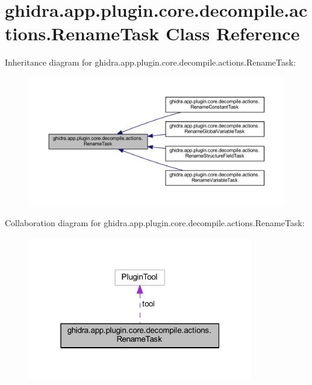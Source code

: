 \hypertarget{classghidra_1_1app_1_1plugin_1_1core_1_1decompile_1_1actions_1_1_rename_task}{}\section{ghidra.\+app.\+plugin.\+core.\+decompile.\+actions.\+Rename\+Task Class Reference}
\label{classghidra_1_1app_1_1plugin_1_1core_1_1decompile_1_1actions_1_1_rename_task}


Inheritance diagram for ghidra.\+app.\+plugin.\+core.\+decompile.\+actions.\+Rename\+Task\+:
\nopagebreak
\begin{figure}[H]
\begin{center}
\leavevmode
\includegraphics[width=350pt]{classghidra_1_1app_1_1plugin_1_1core_1_1decompile_1_1actions_1_1_rename_task__inherit__graph}
\end{center}
\end{figure}


Collaboration diagram for ghidra.\+app.\+plugin.\+core.\+decompile.\+actions.\+Rename\+Task\+:
\nopagebreak
\begin{figure}[H]
\begin{center}
\leavevmode
\includegraphics[width=277pt]{classghidra_1_1app_1_1plugin_1_1core_1_1decompile_1_1actions_1_1_rename_task__coll__graph}
\end{center}
\end{figure}
